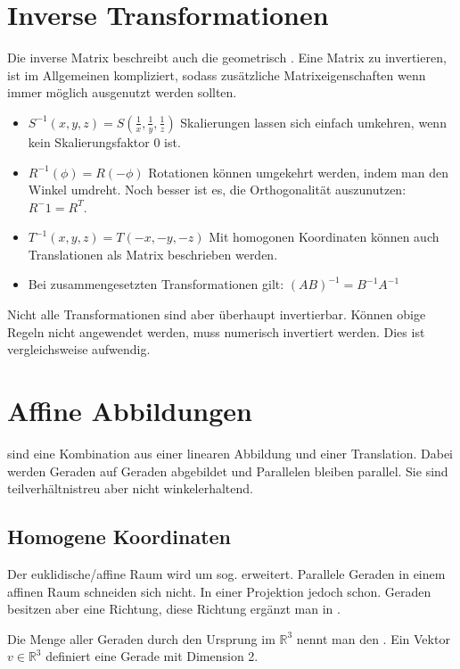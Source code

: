 \section{Inverse Transformationen}
Die inverse Matrix beschreibt auch die geometrisch .
Eine Matrix zu invertieren, ist im Allgemeinen kompliziert, sodass zusätzliche Matrixeigenschaften wenn immer möglich ausgenutzt werden sollten.
\begin{itemize}
  \item $S^{-1}(x, y, z) = S(\frac{1}{x}, \frac{1}{y}, \frac{1}{z})$
  Skalierungen lassen sich einfach umkehren, wenn kein Skalierungsfaktor $0$ ist.
  \item $R^{-1}(\phi) = R(-\phi)$ Rotationen können umgekehrt werden, indem man den Winkel umdreht.
  Noch besser ist es, die Orthogonalität auszunutzen: $R^-1 = R^T$.
  \item $T^{-1}(x, y, z) = T(-x, -y, -z)$
  Mit homogonen Koordinaten können auch Translationen als Matrix beschrieben werden.
  \item Bei zusammengesetzten Transformationen gilt: $(AB)^{-1} = B^{-1}A^{-1}$
\end{itemize}
Nicht alle Transformationen sind aber überhaupt invertierbar.
Können obige Regeln nicht angewendet werden, muss numerisch invertiert werden.
Dies ist vergleichsweise aufwendig.

\section{Affine Abbildungen}
 sind eine Kombination aus einer linearen Abbildung und einer Translation.
Dabei werden Geraden auf Geraden abgebildet und Parallelen bleiben parallel.
Sie sind teilverhältnistreu aber nicht winkelerhaltend.

\subsection{Homogene Koordinaten}
Der euklidische/affine Raum wird um sog.  erweitert.
Parallele Geraden in einem affinen Raum schneiden sich nicht.
In einer Projektion jedoch schon.
Geraden besitzen aber eine Richtung, diese Richtung ergänzt man in .

Die Menge aller Geraden durch den Ursprung im $\mathbb{R}^3$ nennt man den .
Ein Vektor $v \in \mathbb{R}^3$ definiert eine Gerade mit Dimension 2.

